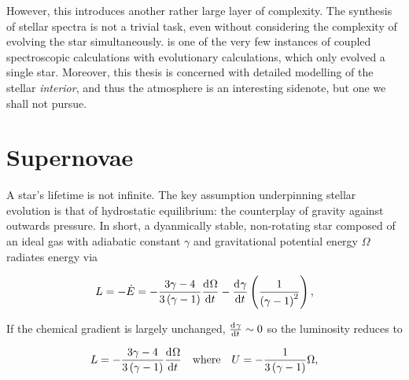 However, this introduces another rather large layer of complexity. The synthesis of stellar spectra is not a trivial task, even without considering the complexity of evolving the star simultaneously. \citet{Groh:2014} is one of the very few instances of coupled spectroscopic calculations with evolutionary calculations, which only evolved a single star. Moreover, this thesis is concerned with detailed modelling of the stellar \textit{interior}, and thus the atmosphere is an interesting sidenote, but one we shall not pursue.

\section{Supernovae}


A star's lifetime is not infinite. The key assumption underpinning stellar evolution is that of hydrostatic equilibrium: the counterplay of gravity against outwards pressure. In short, a dyanmically stable, non-rotating star composed of an ideal gas with adiabatic constant $\gamma$ and gravitational potential energy $\Omega$ radiates energy via

\begin{equation}
    L = -\dot{E} = -\frac{3\gamma-4}{3\pqty{\gamma-1}} \dv{\Omega}{t}-\dv{\gamma}{t}\pqty{\frac{1}{\pqty{\gamma-1}^2}},
\end{equation}

If the chemical gradient is largely unchanged, $\dv{\gamma}{t}\sim0$ so the luminosity reduces to

\begin{equation}
L = -\frac{3\gamma-4}{3\pqty{\gamma-1}} \dv{\Omega}{t}\quad\text{where}\quad U=-\frac{1}{3\pqty{\gamma-1}} \Omega,
\end{equation}

